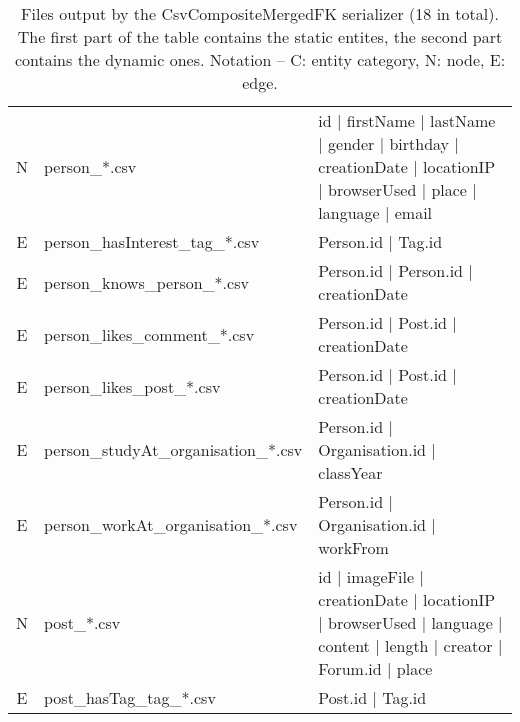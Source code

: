 \begin{table}[htb]
{\begin{tabular}{|c|l|l|}
            \hline
            N                    & person\_*.csv                        & id | firstName | lastName | gender | birthday | creationDate | locationIP | browserUsed | place | language | email  \\
            E                    & person\_hasInterest\_tag\_*.csv      & Person.id | Tag.id                                                                                                  \\
            E                    & person\_knows\_person\_*.csv         & Person.id | Person.id | creationDate                                                                                \\
            E                    & person\_likes\_comment\_*.csv        & Person.id | Post.id | creationDate                                                                                  \\
            E                    & person\_likes\_post\_*.csv           & Person.id | Post.id | creationDate                                                                                  \\
            E                    & person\_studyAt\_organisation\_*.csv & Person.id | Organisation.id | classYear                                                                             \\
            E                    & person\_workAt\_organisation\_*.csv  & Person.id | Organisation.id | workFrom                                                                              \\
            \hline
            N                    & post\_*.csv                          & id | imageFile | creationDate | locationIP | browserUsed | language | content | length | creator | Forum.id | place \\
            E                    & post\_hasTag\_tag\_*.csv             & Post.id | Tag.id                                                                                                    \\
            \hline
        \end{tabular}}
    \caption{Files output by the CsvCompositeMergedFK serializer (18 in total). The first part of the table contains the static entites, the second part contains the dynamic ones. Notation -- C: entity category, N: node, E: edge.}
    \label{table:csv-composite-mergedfk}
\end{table}
